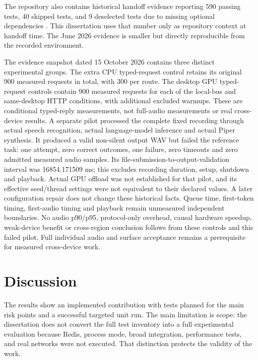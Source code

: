 The repository also contains historical handoff evidence reporting 590 passing tests, 40 skipped tests, and 9 deselected tests due to missing optional dependencies \cite{aurora_handoff_doc}. This dissertation uses that number only as repository context at handoff time. The June 2026 evidence is smaller but directly reproducible from the recorded environment.

The evidence snapshot dated 15 October 2026 contains three distinct experimental groups. The extra CPU typed-request control retains its original 900 measured requests in total, with 300 per route. The desktop GPU typed-request controls contain 900 measured requests for each of the local-bus and same-desktop HTTP conditions, with additional excluded warmups. These are conditional typed-reply measurements, not full-audio measurements or real cross-device results. A separate pilot processed the complete fixed recording through actual speech recognition, actual language-model inference and actual Piper synthesis. It produced a valid non-silent output WAV but failed the reference task: one attempt, zero correct outcomes, one failure, zero timeouts and zero admitted measured audio samples. Its file-submission-to-output-validation interval was 16854.171509 ms; this excludes recording duration, setup, shutdown and playback. Actual GPU offload was not established for that pilot, and its effective seed/thread settings were not equivalent to their declared values. A later configuration repair does not change these historical facts. Queue time, first-token timing, first-audio timing and playback remain unmeasured independent boundaries. No audio p90/p95, protocol-only overhead, causal hardware speedup, weak-device benefit or cross-region conclusion follows from these controls and this failed pilot. Full individual audio and surface acceptance remains a prerequisite for measured cross-device work.

\section{Discussion}
\label{sec:discussion}

The results show an implemented contribution with tests planned for the main risk points and a successful targeted unit run. The main limitation is scope: the dissertation does not convert the full test inventory into a full experimental evaluation because Redis, process mode, broad integration, performance tests, and real networks were not executed. That distinction protects the validity of the work.

